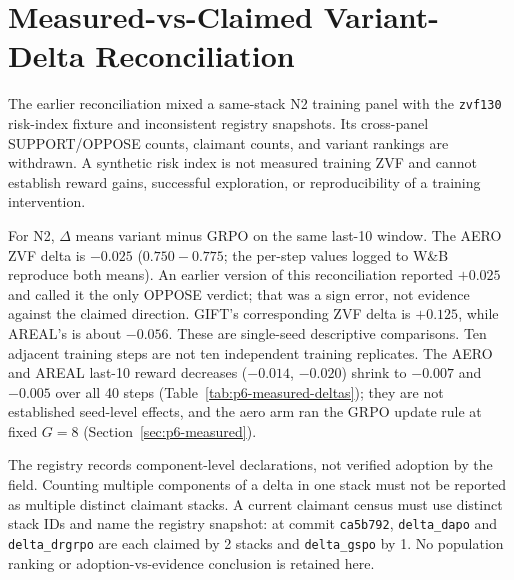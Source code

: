 \section{Measured-vs-Claimed Variant-Delta Reconciliation}
\label{sec:p6-measured-claimed}

The earlier reconciliation mixed a same-stack N2 training panel with the
\texttt{zvf130} risk-index fixture and inconsistent registry snapshots. Its
cross-panel SUPPORT/OPPOSE counts, claimant counts, and variant rankings are
withdrawn. A synthetic risk index is not measured training ZVF and cannot
establish reward gains, successful exploration, or reproducibility of a
training intervention.

For N2, $\Delta$ means variant minus GRPO on the same last-10 window.
The AERO ZVF delta is $-0.025$ ($0.750-0.775$; the per-step values logged to
W\&B reproduce both means). An earlier version of this reconciliation reported $+0.025$ and
called it the only OPPOSE verdict; that was a sign error, not evidence against
the claimed direction. GIFT's corresponding
ZVF delta is $+0.125$, while AREAL's is about $-0.056$.
These are single-seed descriptive comparisons. Ten adjacent training steps
are not ten independent training replicates. The AERO and AREAL last-10
reward decreases ($-0.014$, $-0.020$) shrink to $-0.007$ and $-0.005$ over all
40 steps (Table~\ref{tab:p6-measured-deltas}); they are not established
seed-level effects, and the aero arm ran the GRPO update rule at fixed $G{=}8$
(Section~\ref{sec:p6-measured}).

The registry records component-level declarations, not verified adoption by
the field. Counting multiple components of a delta in one stack must not be
reported as multiple distinct claimant stacks. A current claimant census must
use distinct stack IDs and name the registry snapshot: at commit
\texttt{ca5b792}, \texttt{delta\_dapo} and \texttt{delta\_drgrpo} are each
claimed by 2 stacks and \texttt{delta\_gspo} by 1. No population
ranking or adoption-vs-evidence conclusion is retained here.

